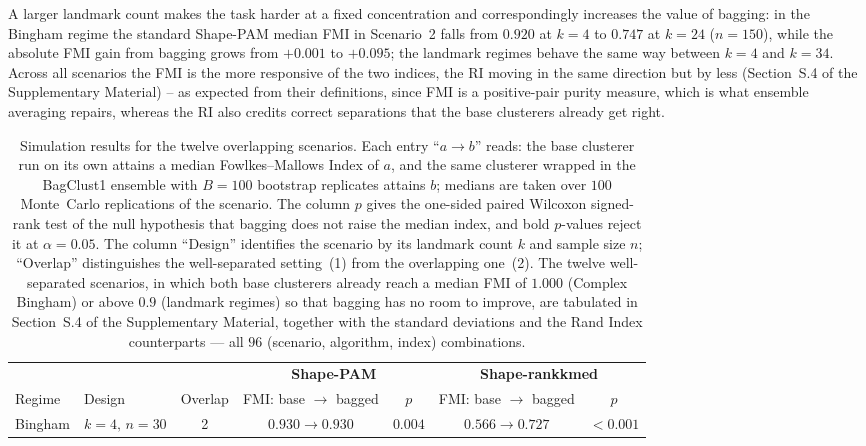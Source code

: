 \documentclass[review,11pt,3p,authoryear]{elsarticle}
\begin{document}
A larger landmark count makes the task harder at a fixed concentration
and correspondingly increases the value of bagging: in the Bingham regime
the standard Shape-PAM median FMI in Scenario~2 falls from $0.920$ at
$k=4$ to $0.747$ at $k=24$ ($n=150$), while the absolute FMI gain from
bagging grows from $+0.001$ to $+0.095$; the landmark regimes behave the
same way between $k=4$ and $k=34$. Across all scenarios the FMI is the more
responsive of the two indices, the RI moving in the same direction but by
less (Section~S.4 of the Supplementary Material) -- as expected from their definitions, since FMI is a
positive-pair purity measure, which is what ensemble averaging repairs,
whereas the RI also credits correct separations that the base clusterers
already get right.

\begin{table}[!htbp]
\centering
\caption{Simulation results for the twelve overlapping scenarios. Each entry
  ``$a\to b$'' reads: the base clusterer run on its own attains a median
  Fowlkes--Mallows Index of $a$, and the same clusterer wrapped in the
  BagClust1 ensemble with $B=100$ bootstrap replicates attains $b$; medians are
  taken over $100$ Monte~Carlo replications of the scenario. The column $p$
  gives the one-sided paired Wilcoxon signed-rank test of the null hypothesis
  that bagging does not raise the median index, and bold $p$-values reject it at
  $\alpha=0.05$. The column ``Design'' identifies the scenario by its landmark
  count $k$ and sample size $n$; ``Overlap'' distinguishes the well-separated
  setting~(1) from the overlapping one~(2). The twelve well-separated scenarios,
  in which both base clusterers already reach a median FMI of $1.000$ (Complex
  Bingham) or above $0.9$ (landmark regimes) so that bagging has no room to
  improve, are tabulated in Section~S.4 of the Supplementary Material, together with the standard deviations
  and the Rand Index counterparts --- all $96$ (scenario, algorithm, index)
  combinations.}
\label{tab:sim-summary}
\footnotesize
\begin{tabular}{llc cc cc}
\toprule
& & & \multicolumn{2}{c}{\textbf{Shape-PAM}}
    & \multicolumn{2}{c}{\textbf{Shape-rankkmed}} \\
\cmidrule(lr){4-5}\cmidrule(lr){6-7}
Regime & Design & Overlap
       & FMI: base $\to$ bagged & $p$
       & FMI: base $\to$ bagged & $p$ \\
\midrule
 \multirow{4}{*}{Bingham} & $k\!=\!4,\,n\!=\!30$ & 2 & $0.930\to 0.930$ & $\mathbf{0.004}$ & $0.566\to 0.727$ & $\mathbf{<\!0.001}$ \\

\end{tabular}
\end{table}
\end{document}
